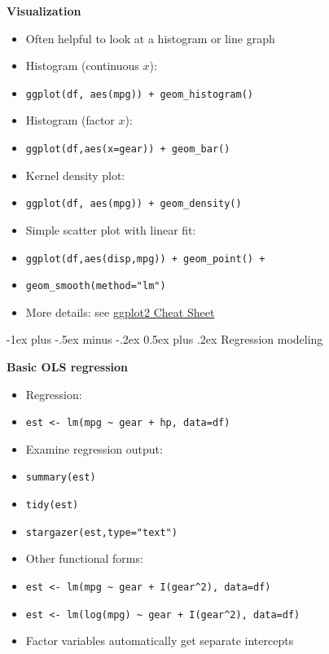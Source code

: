 \documentclass[10pt,landscape]{article}
\makeatletter
\renewcommand{\section}{\@startsection{section}{1}{0mm}%
                                {-1ex plus -.5ex minus -.2ex}%
                                {0.5ex plus .2ex}%
                                {\normalfont\large\bfseries}}
\makeatother
\begin{document}
\begin{multicols}{3}
\textbf{Visualization}\\
\begin{itemize}
    \item Often helpful to look at a histogram or line graph
    \item Histogram (continuous $x$):
    \item[] \verb!ggplot(df, aes(mpg)) + geom_histogram()!
    \item Histogram (factor $x$):
    \item[] \verb!ggplot(df,aes(x=gear)) + geom_bar()!
    \item Kernel density plot:
    \item[] \verb!ggplot(df, aes(mpg)) + geom_density()!
    \item Simple scatter plot with linear fit:
    \item[] \verb!ggplot(df,aes(disp,mpg)) + geom_point() +!
    \item[] \verb!geom_smooth(method="lm")!
    \item More details: see \href{https://www.rstudio.com/wp-content/uploads/2015/03/ggplot2-cheatsheet.pdf}{ggplot2 Cheat Sheet}
\end{itemize}


\section{Regression modeling}

\smallskip{}

\textbf{Basic OLS regression}\\
\begin{itemize}
    \item Regression:
    \item[] \verb!est <- lm(mpg ~ gear + hp, data=df)!
    \item Examine regression output:
    \item[] \verb!summary(est)!
    \item[] \verb!tidy(est)!
    \item[] \verb!stargazer(est,type="text")!
    \item Other functional forms:
    \item[] \verb!est <- lm(mpg ~ gear + I(gear^2), data=df)!
    \item[] \verb!est <- lm(log(mpg) ~ gear + I(gear^2), data=df)!
    \item Factor variables automatically get separate intercepts
\end{itemize}


\end{multicols}
\end{document}
